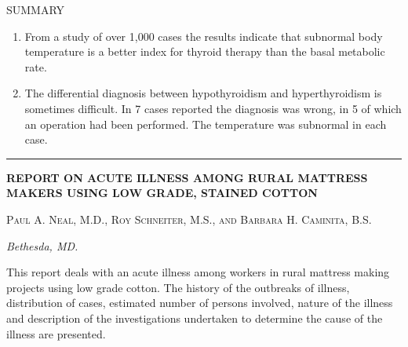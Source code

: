 \documentclass[10pt, letterpaper]{memoir}
\begin{document}
\begin{multicols}{2}
\begin{center}
    SUMMARY
\end{center}

\begin{enumerate}[leftmargin=*]
    \item From a study of over 1,000 cases the results indicate that subnormal body temperature is a better index for thyroid therapy than the basal metabolic rate.
    \item The differential diagnosis between hypothyroidism and hyperthyroidism is sometimes difficult. In 7 cases reported the diagnosis was wrong, in 5 of which an operation had been performed. The temperature was subnormal in each case.
\end{enumerate}

\begin{center}
   \noindent\rule{0.5\columnwidth}{1pt} 
\end{center}

\noindent%
\begin{minipage}[t]{\columnwidth}
    \vspace{0.25em}\par
    {\parbox{\linewidth}{\raggedright\sffamily\bfseries\fontsize{18}{18}\selectfont\MakeUppercase{REPORT ON ACUTE ILLNESS AMONG RURAL MATTRESS MAKERS USING LOW GRADE, STAINED COTTON}}\par}
    \vspace{1.5em}\par

    {\sffamily\large\textsc{Paul A. Neal, M.D., Roy Schneiter, M.S., and Barbara H. Caminita, B.S.}\par}
    \vspace{0.4em}\par
    {\sffamily\normalsize\itshape Bethesda, MD.\par}

    \vspace{1.5em}\par
\end{minipage}

This report deals with an acute illness among workers in rural mattress making projects using low grade cotton. The history of the outbreaks of illness, distribution of cases, estimated number of persons involved, nature of the illness and description of the investigations undertaken to determine the cause of the illness are presented.


\end{multicols}
\end{document}

